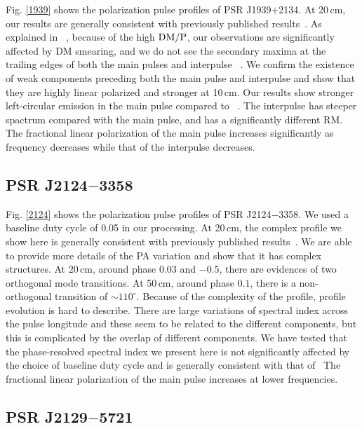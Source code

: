 \documentclass[useAMS,usenatbib]{mn2e}
\begin{document}
Fig. \ref{1939} shows the polarization pulse profiles of 
PSR J1939$+$2134.
%
At 20\,cm, our results are generally consistent with previously published 
results~\citep{Yan11}.
%
As explained in ~\citet{Yan11}, because of the high $\rm{DM}/P$, our observations 
are significantly affected by DM smearing, and we do not see the secondary 
maxima at the trailing edges of both the main pulses and interpulse
~\citep{Thorsett90,Stairs99,Ord04}.
%
We confirm the existence of weak components preceding both the main pulse 
and interpulse and show that they are highly linear polarized and stronger 
at 10\,cm. 
%
Our results show stronger left-circular emission in the main pulse compared 
to ~\citet{Yan11}.
%
The interpulse has steeper spactrum compared with the main pulse, and has 
a significantly different RM.
%
The fractional linear polarization of the main pulse increases significantly 
as frequency decreases while that of the interpulse decreases.

\subsection{PSR J2124$-$3358}

Fig. \ref{2124} shows the polarization pulse profiles of 
PSR J2124$-$3358.
%
We used a baseline duty cycle of 0.05 in our processing.
%
At 20\,cm, the complex profile we show here is generally consistent with 
previously published results~\citep{Yan11}.
%
We are able to provide more details of the PA variation and show that it has 
complex structures.
%
At 20\,cm, around phase $0.03$ and $-0.5$, there are evidences of two 
orthogonal mode transitions.
%
At 50\,cm, around phase $0.1$, there is a non-orthogonal transition of 
$\sim110^{\circ}$.
%
Because of the complexity of the profile, profile evolution is hard to 
describe. There are large variations of spectral index across the pulse 
longitude and these seem to be related to the different components, but 
this is complicated by the overlap of different components.
%
We have tested that the phase-resolved spectral index we present here is 
not significantly affected by the choice of baseline duty cycle and is 
generally consistent with that of~\citet{Manchester04}
%
The fractional linear polarization of the main pulse increases at lower 
frequencies.

\subsection{PSR J2129$-$5721}
\end{document}
